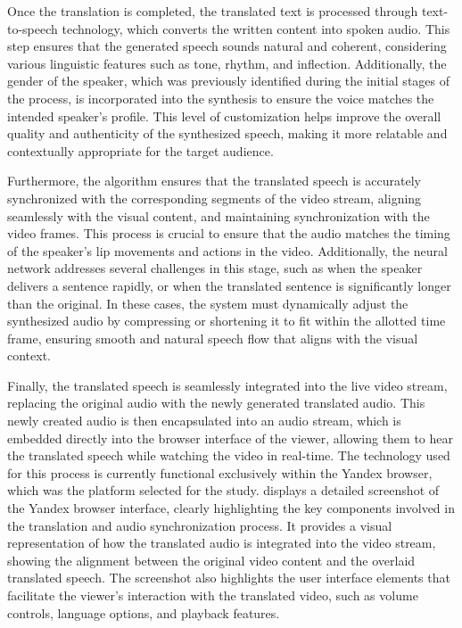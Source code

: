 Once the translation is completed, the translated text is processed
through text-to-speech technology, which converts the written content
into spoken audio. This step ensures that the generated speech sounds
natural and coherent, considering various linguistic features such as
tone, rhythm, and inflection. Additionally, the gender of the speaker,
which was previously identified during the initial stages of the
process, is incorporated into the synthesis to ensure the voice matches
the intended speaker's profile. This level of
customization helps improve the overall quality and authenticity of the
synthesized speech, making it more relatable and contextually
appropriate for the target audience.

Furthermore, the algorithm ensures that the translated speech is
accurately synchronized with the corresponding segments of the video
stream, aligning seamlessly with the visual content, and maintaining
synchronization with the video frames. This process is crucial to ensure
that the audio matches the timing of the speaker's lip movements and
actions in the video. Additionally, the neural network addresses several
challenges in this stage, such as when the speaker delivers a sentence
rapidly, or when the translated sentence is significantly longer than
the original. In these cases, the system must dynamically adjust the
synthesized audio by compressing or shortening it to fit within the
allotted time frame, ensuring smooth and natural speech flow that aligns
with the visual context.

Finally, the translated speech is seamlessly integrated into the live
video stream, replacing the original audio with the newly generated
translated audio. This newly created audio is then encapsulated into an
audio stream, which is embedded directly into the browser interface of
the viewer, allowing them to hear the translated speech while watching
the video in real-time. The technology used for this process is
currently functional exclusively within the Yandex browser, which was
the platform selected for the study.  displays a detailed
screenshot of the Yandex browser interface, clearly highlighting the key
components involved in the translation and audio synchronization
process. It provides a visual representation of how the translated audio
is integrated into the video stream, showing the alignment between the
original video content and the overlaid translated speech. The
screenshot also highlights the user interface elements that facilitate
the viewer's interaction with the translated video, such as volume
controls, language options, and playback features.

